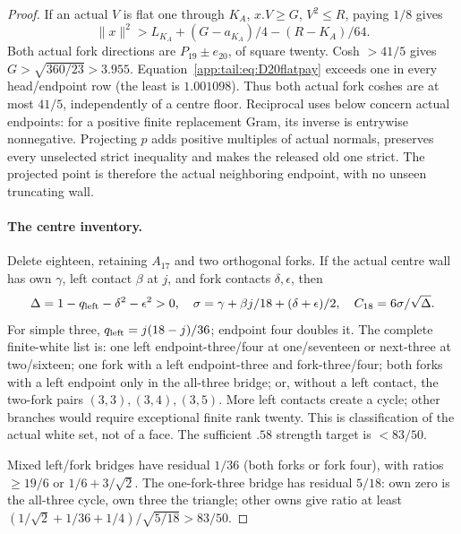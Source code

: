 \documentclass[11pt]{article}
\theoremstyle{definition}
\theoremstyle{remark}
\newcommand{\norm}[1]{\lVert #1\rVert}
\begin{document}
\begin{proof}
If an actual $V$ is flat one through $K_A$, $x.V\ge G$,
$V^2\le R$, paying $1/8$ gives
\begin{equation}\label{app:tail:eq:D20flatpay}
 \norm x^2>L_{K_A}+(G-a_{K_A})/4-(R-K_A)/64.
\end{equation}
Both actual fork directions are $P_{19}\pm e_{20}$, of square
twenty. Cosh $>41/5$ gives $G>\sqrt{360/23}>3.955$.
Equation~\eqref{app:tail:eq:D20flatpay} exceeds one in every
head/endpoint row (the least is $1.001098$).
Thus both actual fork coshes are at most $41/5$, independently
of a centre floor. Reciprocal uses below concern actual endpoints:
for a positive finite replacement Gram, its inverse is entrywise
nonnegative. Projecting $p$ adds positive multiples of actual
normals, preserves every unselected strict inequality and makes
the released old one strict. The projected point is therefore
the actual neighboring endpoint, with no unseen truncating wall.

\paragraph{The centre inventory.}
Delete eighteen, retaining $A_{17}$ and two orthogonal forks.
If the actual centre wall has own $\gamma$, left contact
$\beta$ at $j$, and fork contacts $\delta,\epsilon$, then
\[
 \Delta=1-q_{\rm left}-\delta^2-\epsilon^2>0,
 \quad \sigma=\gamma+\beta j/18+(\delta+\epsilon)/2,
 \quad C_{18}=6\sigma/\sqrt\Delta.
\]
For simple three, $q_{\rm left}=j(18-j)/36$; endpoint four
doubles it. The complete finite-white list is: one left
endpoint-three/four at one/seventeen or next-three at two/sixteen;
one fork with a left endpoint-three and fork-three/four;
both forks with a left endpoint only in the all-three bridge;
or, without a left contact, the two-fork pairs
$(3,3),(3,4),(3,5)$. More left contacts create a cycle;
other branches would require exceptional finite rank twenty.
This is classification of the actual white set, not of a face.
The sufficient $.58$ strength target is $<83/50$.

Mixed left/fork bridges have residual $1/36$ (both forks or
fork four), with ratios $\ge19/6$ or $1/6+3/\sqrt2$.
The one-fork-three bridge has residual $5/18$: own zero is
the all-three cycle, own three the triangle; other owns give
ratio at least $(1/\sqrt2+1/36+1/4)/\sqrt{5/18}>83/50$.


\end{proof}
\end{document}
